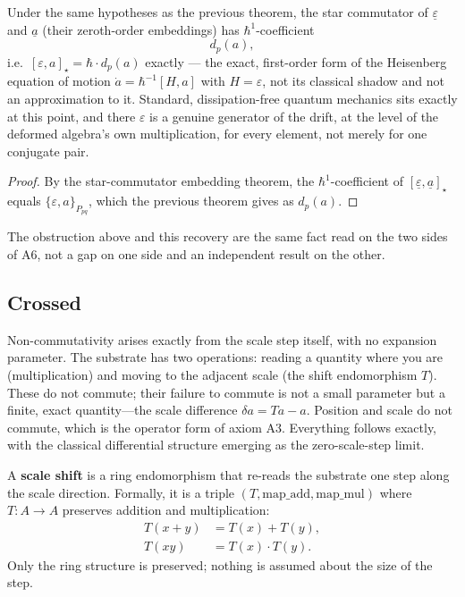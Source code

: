 \begin{theorem}
Under the same hypotheses as the previous theorem, the star commutator of $\underline{\varepsilon}$ and $\underline{a}$ (their zeroth-order embeddings) has $\hbar^1$-coefficient
\[
d_p(a) ,
\]
i.e.\ $[\varepsilon, a]_\star = \hbar \cdot d_p(a)$ exactly — the exact, first-order form of the Heisenberg equation of motion $\dot a = \hbar^{-1}[H,a]$ with $H = \varepsilon$, not its classical shadow and not an approximation to it. Standard, dissipation-free quantum mechanics sits exactly at this point, and there $\varepsilon$ is a genuine generator of the drift, at the level of the deformed algebra's own multiplication, for every element, not merely for one conjugate pair.
\begin{proof}
By the star-commutator embedding theorem, the $\hbar^1$-coefficient of $[\underline{\varepsilon},\underline{a}]_\star$ equals $\{\varepsilon,a\}_{P_{pq}}$, which the previous theorem gives as $d_p(a)$.
\end{proof}
\end{theorem}

The obstruction above and this recovery are the same fact read on the two sides of A6, not a gap on one side and an independent result on the other.

\subsection{Crossed}

Non-commutativity arises exactly from the scale step itself, with no expansion parameter. The substrate has two operations: reading a quantity where you are (multiplication) and moving to the adjacent scale (the shift endomorphism $T$). These do not commute; their failure to commute is not a small parameter but a finite, exact quantity—the scale difference $\delta a = Ta - a$. Position and scale do not commute, which is the operator form of axiom A3. Everything follows exactly, with the classical differential structure emerging as the zero-scale-step limit.

\begin{definition}
A \textbf{scale shift} is a ring endomorphism that re-reads the substrate one step along the scale direction. Formally, it is a triple $(T, \text{map\_add}, \text{map\_mul})$ where $T : A \to A$ preserves addition and multiplication:
\begin{align}
T(x + y) &= T(x) + T(y), \\
T(xy) &= T(x) \cdot T(y) .
\end{align}
Only the ring structure is preserved; nothing is assumed about the size of the step.
\end{definition}

